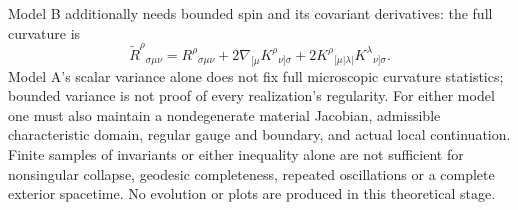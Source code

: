 Model B additionally needs bounded spin and its covariant derivatives: the full curvature is
\begin{equation}
 \widetilde R^\rho{}_{\sigma\mu\nu}
 =R^\rho{}_{\sigma\mu\nu}
 +2\nabla_{[\mu}K^\rho{}_{\nu]\sigma}
 +2K^\rho{}_{[\mu|\lambda|}K^\lambda{}_{\nu]\sigma}.
\end{equation}
Model A's scalar variance alone does not fix full microscopic curvature statistics; bounded variance is not proof of every realization's regularity. For either model one must also maintain a nondegenerate material Jacobian, admissible characteristic domain, regular gauge and boundary, and actual local continuation. Finite samples of invariants or either inequality alone are not sufficient for nonsingular collapse, geodesic completeness, repeated oscillations or a complete exterior spacetime. No evolution or plots are produced in this theoretical stage.
